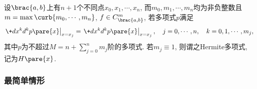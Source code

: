 \documentclass[hidelinks]{ctexart}
\begin{document}
\begin{definition}
    设$\brac{a,b}$上有$n+1$个不同点$x_0,x_1,\cdots,x_n$, 而$m_0,m_1,\cdots,m_n$均为非负整数且$m = \max \curb{m_0,\cdots,m_n}$, $f\in C^m_{\brac{a,b}}$, 若多项式$p$满足
    \[ \left.\+d{x^k}d{^kp\pare{x}}\right\vert_{x=x_j} = \left.\+d{x^k}d{^kp\pare{x}}\right\vert_{x=x_j},\quad j = 0,\cdots,n,\quad k = 0,1,\cdots,m_j, \]
    其中$p$为不超过$M = n + \displaystyle \sum_{j=0}^n m_j$阶的多项式. 若$m_j \equiv 1$, 则谓之Hermite多项式, 记为$H\pare{x}$.
\end{definition}


\subsubsection{最简单情形} %
\label{ssub:最简单情形}
\end{document}
